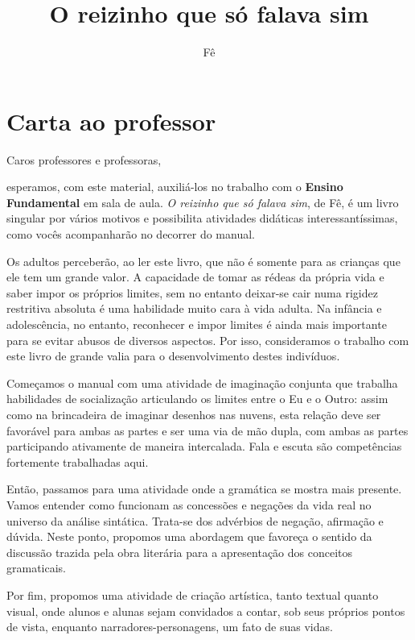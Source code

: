 \documentclass[11pt]{extarticle}
\newcommand{\AutorLivro}{Fê}
\newcommand{\TituloLivro}{O reizinho que só falava sim}
\newcommand{\colaborador}{Renier Silva}
\begin{document}
\title{\TituloLivro}
\author{\AutorLivro}
\def\authornotes{\colaborador}

\date{}
\maketitle

\tableofcontents

\section{Carta ao professor}

Caros professores e professoras,

esperamos, com este material,
auxiliá-los no trabalho com o \textbf{Ensino Fundamental} em 
sala de aula. \textit{O reizinho que só falava sim}, de Fê, é um livro singular
por vários motivos e possibilita atividades didáticas interessantíssimas,
como vocês acompanharão no decorrer do manual.

Os adultos perceberão, ao ler este livro, que não é somente para as crianças que ele 
tem um grande valor. A capacidade de tomar as rédeas da própria vida e saber
impor os próprios limites, sem no entanto deixar-se cair numa rigidez restritiva absoluta
é uma habilidade muito cara à vida adulta. Na infância e adolescência, no entanto,
reconhecer e impor limites é ainda mais importante para se evitar abusos de diversos
aspectos. Por isso, consideramos o trabalho com este livro de grande valia 
para o desenvolvimento destes indivíduos. 

Começamos o manual com uma atividade de imaginação conjunta que trabalha
habilidades de socialização articulando os limites entre o Eu e o Outro:
assim como na brincadeira de imaginar desenhos nas nuvens, esta relação
deve ser favorável para ambas as partes e ser uma via de mão dupla,
com ambas as partes participando ativamente de maneira intercalada.
Fala e escuta são competências fortemente trabalhadas aqui. 

Então, passamos para uma atividade onde a gramática se mostra mais presente. 
Vamos entender como funcionam as concessões e negações da vida real 
no universo da análise sintática. Trata-se dos advérbios de negação, afirmação e dúvida. 
Neste ponto, propomos uma abordagem que favoreça o sentido da discussão trazida
pela obra literária para a apresentação dos conceitos gramaticais.

Por fim, propomos uma atividade de criação artística, tanto textual quanto visual, 
onde alunos e alunas sejam convidados a contar, sob seus próprios
pontos de vista, enquanto narradores-personagens, um fato de suas vidas. 
\end{document}
